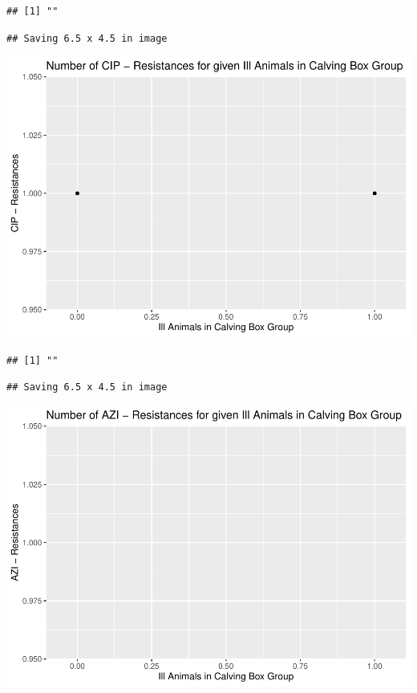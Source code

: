 \documentclass[
]{article}
\begin{document}
\begin{verbatim}
## [1] ""
\end{verbatim}

\begin{verbatim}
## Saving 6.5 x 4.5 in image
\end{verbatim}

\includegraphics{NResistenzen_files/figure-latex/binary_or_nominal_variables-22.pdf}

\begin{verbatim}
## [1] ""
\end{verbatim}

\begin{verbatim}
## Saving 6.5 x 4.5 in image
\end{verbatim}

\includegraphics{NResistenzen_files/figure-latex/binary_or_nominal_variables-23.pdf}
\end{document}
